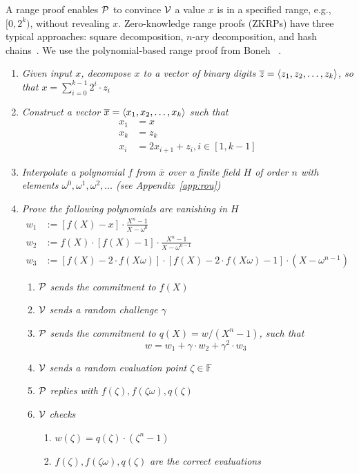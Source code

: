 A range proof enables $\mathcal{P}$ to convince $\mathcal{V}$ a value $x$ is in a specified range, e.g., $[0,2^k)$, without revealing $x$. Zero-knowledge range proofs (ZKRPs) have three typical approaches: square decomposition, $n$-ary decomposition, and hash chains~\cite{zkrp}. We use the polynomial-based range proof from Boneh \etal~\cite{rangeproof}.
\begin{enumerate}
    \item \textit{Given input $x$, decompose $x$ to a vector of binary digits $\overline{z}=\left \langle z_1,z_2,\dots,z_k \right \rangle$, so that $x=\sum_{i=0}^{k-1}2^i\cdot{z_i}$} 
    \item \textit{Construct a vector $\overline{x}=\left \langle x_1,x_2,\dots,x_k \right \rangle$ such that}
    \begin{align*}
        x_1&=x \\
        x_k&=z_k \\
        x_i&=2x_{i+1}+z_i,i\in[1,k-1]
    \end{align*}
    \item \textit{Interpolate a polynomial $f$ from $\overline{x}$ over a finite field $H$ of order $n$ with elements $\omega^0,\omega^1,\omega^2,\ldots$ (see Appendix~\ref{app:rou})} 
    \item \textit{Prove the following polynomials are vanishing in $H$}
    \begin{align*}
        w_1&:=[f(X)-x]\cdot\frac{X^n-1}{X-\omega^0} \\
        w_2&:=f(X)\cdot[f(X)-1]\cdot\frac{X^n-1}{X-\omega^{n-1}} \\
        w_3&:=[f(X)-2\cdot{f(X\omega)}]\cdot[f(X)-2\cdot{f(X\omega)}-1]\cdot(X-\omega^{n-1})
    \end{align*}
    \begin{enumerate}
        \item $\mathcal{P}$ \textit{sends the commitment to $f(X)$}
        \item $\mathcal{V}$ \textit{sends a random challenge $\gamma$}
        \item $\mathcal{P}$ \textit{sends the commitment to $q(X)=w/(X^n-1)$, such that}
        \[ w=w_1+\gamma\cdot{w_2}+\gamma^2\cdot{w_3} \]
        \item $\mathcal{V}$ \textit{sends a random evaluation point $\zeta\in\mathbb{F}$}
        \item $\mathcal{P}$ \textit{replies with $f(\zeta),f(\zeta\omega),q(\zeta)$}
        \item $\mathcal{V}$ \textit{checks}
        \begin{enumerate}
            \item $w(\zeta)=q(\zeta)\cdot(\zeta^n-1)$
            \item $f(\zeta),f(\zeta\omega),q(\zeta)$ \textit{are the correct evaluations}
        \end{enumerate}
    \end{enumerate}
\end{enumerate}

